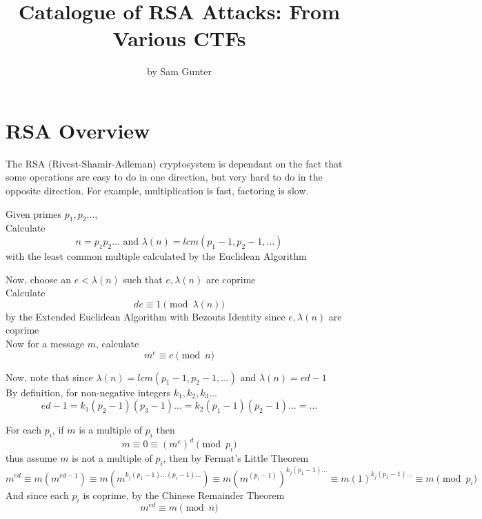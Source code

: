 \documentclass[11pt,notitlepage]{report}
\makeatletter
\newcommand*{\toccontents}{\@starttoc{toc}}
\makeatother
\begin{document}
\parindent=0pt

\title{\vspace{-15mm}Catalogue of RSA Attacks: From Various CTFs\vspace{-5mm}}
\author{by Sam Gunter}
\date{}
\maketitle

\toccontents

\thispagestyle{empty}
\newpage
\setcounter{page}{1}

\section{RSA Overview}

The RSA (Rivest-Shamir-Adleman) cryptosystem is dependant on the fact that some operations are easy to do in one direction, but very hard to do in the opposite direction. For example, multiplication is fast, factoring is slow.

Given primes $p_1, p_2 \dots$,\\
Calculate
$$n = p_1 p_2 \dots \text{ and } \lambda(n) = lcm(p_1-1, p_2-1, \dots)$$
with the least common multiple calculated by the Euclidean Algorithm

Now, choose an $e < \lambda(n)$ such that $e, \lambda(n)$ are coprime\\
Calculate
$$de \equiv 1 \pmod{\lambda(n)}$$
by the Extended Euclidean Algorithm with Bezouts Identity since $e, \lambda(n)$ are coprime\\


Now for a message $m$, calculate
$$m^e \equiv c \pmod{n}$$

Now, note that since $\lambda(n) = lcm(p_1-1, p_2-1, \dots)$ and $\lambda(n) = ed - 1$\\
By definition, for non-negative integers $k_1, k_2, k_3 \dots$
$$ed - 1 = k_1(p_2-1)(p_3-1)\dots = k_2(p_1-1)(p_2-1)\dots = \dots$$

For each $p_i$, if $m$ is a multiple of $p_i$ then 
$$m \equiv 0 \equiv (m^e)^d \pmod{p_i}$$
thus assume $m$ is not a multiple of $p_i$, then by Fermat's Little Theorem
$$m^{ed} \equiv m \left(m^{ed-1}\right) \equiv m \left(m^{k_j(p_1-1)\dots(p_i-1)\dots}\right) \equiv m \left(m^{(p_i - 1)}\right)^{k_j(p_1-1)\dots} \equiv m \left(1\right)^{k_j(p_1-1)\dots} \equiv m \pmod{p_i}$$
And since each $p_i$ is coprime, by the Chinese Remainder Theorem
$$m^{ed} \equiv m \pmod{n}$$
\end{document}

